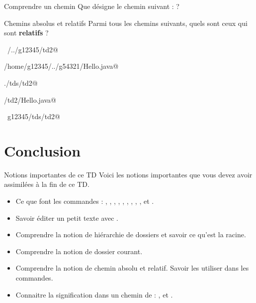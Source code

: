 \documentclass[a4paper,11pt]{style-esi/td}
\begin{document}
		\begin{Exercice}{Comprendre un chemin}
			Que désigne le chemin suivant :
			 ?
		\end{Exercice}

\newpage

		\begin{Exercice}{Chemins absolus et relatifs}
			Parmi tous les chemins suivants, quels sont ceux qui sont 
			\textbf{relatifs} ?			
			\begin{selectmany} 
			\item \verb@~/../g12345/td2@
			\item \verb@/home/g12345/../g54321/Hello.java@
			\item \verb@./tds/td2@
			\item \verb@tds/td2/Hello.java@
			\item \verb@~g12345/tds/td2@
			\end{selectmany} 
		\end{Exercice}

\section{Conclusion}

	\begin{theorie}{Notions importantes de ce TD}
		Voici les notions importantes que vous devez avoir assimilées à la fin de ce TD.
		\begin{itemize}
		\item 
			Ce que font les commandes : 
			, , , ,
			, , , 
			, ,  et .
		\item 
			Savoir éditer un petit texte avec .
		\item 
			Comprendre la notion de hiérarchie de dossiers 
			et savoir ce qu'est la racine.
		\item 
			Comprendre la notion de dossier courant.
		\item 
			Comprendre la notion de chemin absolu et relatif.
			Savoir les utiliser dans les commandes.
		\item 
			Connaitre la signification dans un chemin de : 
			\og{}\samp{\textasciitilde}\fg{},
			\og{}\fg{} et \og{}\fg{}.
		\end{itemize}
	\end{theorie}
\end{document}
